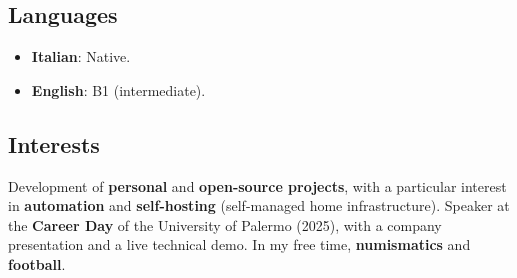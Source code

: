 \documentclass[11pt]{article}
\begin{document}
\subsection{Languages}
\begin{itemize}
  \item \textbf{Italian}: Native.
  \item \textbf{English}: B1 (intermediate).
\end{itemize}

\subsection{Interests}
\noindent Development of \textbf{personal} and \textbf{open-source projects}, with a particular interest in \textbf{automation} and \textbf{self-hosting} (self-managed home infrastructure). Speaker at the \textbf{Career Day} of the University of Palermo (2025), with a company presentation and a live technical demo. In my free time, \textbf{numismatics} and \textbf{football}.
\end{document}
